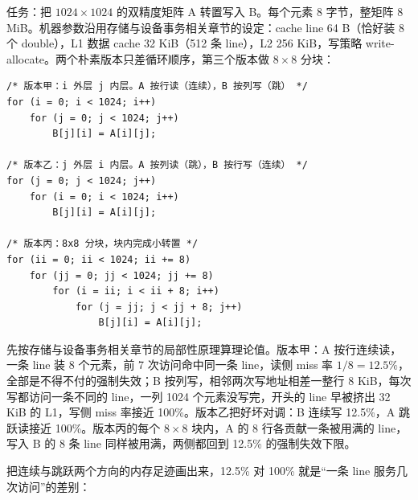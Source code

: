 任务：把 $1024\times1024$ 的双精度矩阵 A 转置写入 B。每个元素 8 字节，整矩阵 8 MiB。机器参数沿用存储与设备事务相关章节的设定：cache line 64 B（恰好装 8 个 double），L1 数据 cache 32 KiB（512 条 line），L2 256 KiB，写策略 write-allocate。两个朴素版本只差循环顺序，第三个版本做 $8\times8$ 分块：

\begin{lstlisting}
/* 版本甲：i 外层 j 内层。A 按行读（连续），B 按列写（跳） */
for (i = 0; i < 1024; i++)
    for (j = 0; j < 1024; j++)
        B[j][i] = A[i][j];

/* 版本乙：j 外层 i 内层。A 按列读（跳），B 按行写（连续） */
for (j = 0; j < 1024; j++)
    for (i = 0; i < 1024; i++)
        B[j][i] = A[i][j];

/* 版本丙：8x8 分块，块内完成小转置 */
for (ii = 0; ii < 1024; ii += 8)
    for (jj = 0; jj < 1024; jj += 8)
        for (i = ii; i < ii + 8; i++)
            for (j = jj; j < jj + 8; j++)
                B[j][i] = A[i][j];
\end{lstlisting}

先按存储与设备事务相关章节的局部性原理算理论值。版本甲：A 按行连续读，一条 line 装 8 个元素，前 7 次访问命中同一条 line，读侧 miss 率 $1/8=12.5\%$，全部是不得不付的强制失效；B 按列写，相邻两次写地址相差一整行 8 KiB，每次写都访问一条不同的 line，一列 1024 个元素没写完，开头的 line 早被挤出 32 KiB 的 L1，写侧 miss 率接近 100\%。版本乙把好坏对调：B 连续写 12.5\%，A 跳跃读接近 100\%。版本丙的每个 $8\times8$ 块内，A 的 8 行各贡献一条被用满的 line，写入 B 的 8 条 line 同样被用满，两侧都回到 12.5\% 的强制失效下限。

把连续与跳跃两个方向的内存足迹画出来，12.5\% 对 100\% 就是“一条 line 服务几次访问”的差别：

